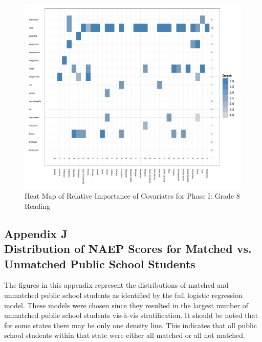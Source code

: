 \documentclass[letterpaper,12p,twoside]{article} %
\begin{document}
\begin{figure}[h]
\begin{center}
\includegraphics[width=\textwidth]{../Figures/g8readingtreeHeat.pdf}
\caption{Heat Map of Relative Importance of Covariates for Phase I: Grade 8 Reading}
\label{fig:g8reading:treeheat}
\end{center}
\end{figure}


\cleardoublepage
{}
\subsection*{Appendix J\\Distribution of NAEP Scores for Matched vs. Unmatched Public School Students}
\label{appendixPublicDensity}

The figures in this appendix represent the distributions of matched and unmatched public school students as identified by the full logistic regression model. These models were chosen since they resulted in the largest number of unmatched public school students vis-\`a-vis stratification. It should be noted that for some states there may be only one density line. This indicates that all public school students within that state were either all matched or all not matched.
\end{document}

